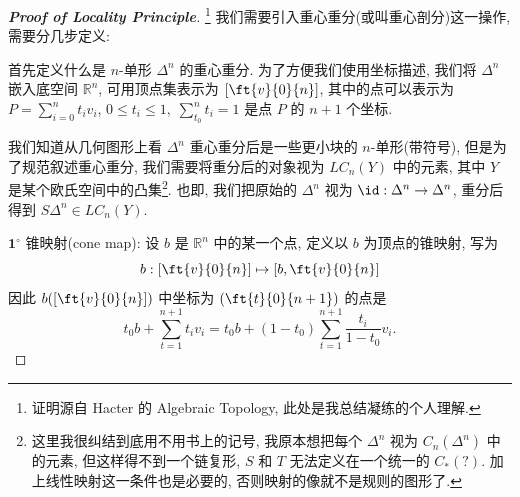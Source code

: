         \begin{proof}[{\bf Proof of Locality Principle}]\footnote{证明源自 Hacter 的 Algebraic Topology, 此处是我总结凝练的个人理解.}
            我们需要引入重心重分(或叫重心剖分)这一操作, 需要分几步定义:

             首先定义什么是 $n$-单形 $\Delta^n$ 的重心重分. 为了方便我们使用坐标描述, 
            我们将 $\Delta^n$ 嵌入底空间 $\mathbb{R}^n$, 可用顶点集表示为 $[\ft{v}{0}{n}]$, 
            其中的点可以表示为 $P = \sum_{i=0}^{n}t_iv_i$, $0\leq t_i\leq 1,\;\sum_{t_0}^{n}t_i=1$ 是点 $P$ 的 $n+1$ 个坐标.
            
            我们知道从几何图形上看 $\Delta^n$ 重心重分后是一些更小块的 $n$-单形(带符号),
            但是为了规范叙述重心重分, 我们需要将重分后的对象视为 $LC_n(Y)$ 中的元素, 其中 $Y$ 是某个欧氏空间中的凸集\footnote{这里我很纠结到底用不用书上的记号, 我原本想把每个 $\Delta^n$ 视为 $C_n(\Delta^n)$ 中的元素, 但这样得不到一个链复形, $S$ 和 $T$ 无法定义在一个统一的 $C_*(?)$. 加上线性映射这一条件也是必要的, 否则映射的像就不是规则的图形了.}. 
            也即, 我们把原始的 $\Delta^n$ 视为 $\id:\Delta^n\rightarrow\Delta^n$, 重分后得到 $S\Delta^n\in LC_n(Y)$.

            \noindent$\mathbf{1}^{\circ}$ 锥映射(cone map): 设 $b$ 是 $\mathbb{R}^{n}$ 中的某一个点, 定义以 $b$ 为顶点的锥映射, 写为
            \begin{equation*}
                b:[\ft{v}{0}{n}]\mapsto[b,\ft{v}{0}{n}]
            \end{equation*}
            因此 $b([\ft{v}{0}{n}])$ 中坐标为 $(\ft{t}{0}{n+1})$ 的点是 
            \begin{equation*}
                t_0b+\sum_{t=1}^{n+1}t_iv_i=t_0b+\left(1-t_0\right)\sum_{t=1}^{n+1}\dfrac{t_i}{1-t_0}v_i. 
            \end{equation*}


\end{proof}

